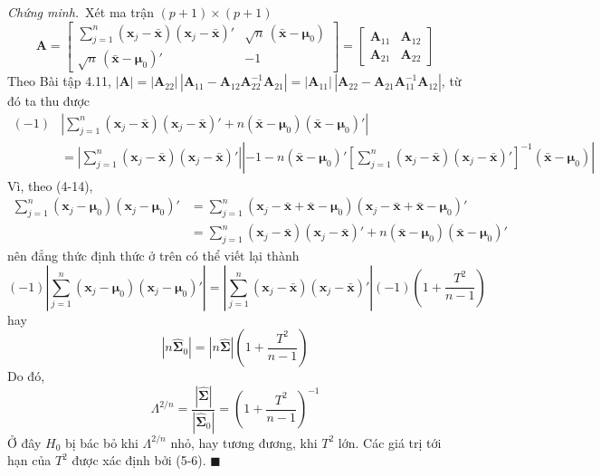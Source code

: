 \par\noindent\textit{Chứng minh.}\ 
Xét ma trận $(p+1)\times(p+1)$
\[
\mathbf{A} =
\begin{bmatrix}
\sum\limits_{j=1}^{n}(\mathbf{x}_j-\bar{\mathbf{x}})(\mathbf{x}_j-\bar{\mathbf{x}})' & \sqrt{n}\,(\bar{\mathbf{x}}-\boldsymbol{\mu}_0)\\[6pt]
\sqrt{n}\,(\bar{\mathbf{x}}-\boldsymbol{\mu}_0)' & -1
\end{bmatrix}
=
\begin{bmatrix}
\mathbf{A}_{11} & \mathbf{A}_{12}\\
\mathbf{A}_{21} & \mathbf{A}_{22}
\end{bmatrix}
\]
Theo Bài tập 4.11, $|\mathbf{A}| = |\mathbf{A}_{22}|\,|\mathbf{A}_{11}-\mathbf{A}_{12}\mathbf{A}_{22}^{-1}\mathbf{A}_{21}| = |\mathbf{A}_{11}|\,|\mathbf{A}_{22}-\mathbf{A}_{21}\mathbf{A}_{11}^{-1}\mathbf{A}_{12}|$, từ đó ta thu được
\begin{align*}
(-1)&\left|\sum_{j=1}^{n}(\mathbf{x}_j-\bar{\mathbf{x}})(\mathbf{x}_j-\bar{\mathbf{x}})' + n(\bar{\mathbf{x}}-\boldsymbol{\mu}_0)(\bar{\mathbf{x}}-\boldsymbol{\mu}_0)'\right| \\
&= \left|\sum_{j=1}^{n}(\mathbf{x}_j-\bar{\mathbf{x}})(\mathbf{x}_j-\bar{\mathbf{x}})'\right| \left|-1-n(\bar{\mathbf{x}}-\boldsymbol{\mu}_0)'\left[\sum_{j=1}^{n}(\mathbf{x}_j-\bar{\mathbf{x}})(\mathbf{x}_j-\bar{\mathbf{x}})'\right]^{-1}(\bar{\mathbf{x}}-\boldsymbol{\mu}_0)\right|
\end{align*}
Vì, theo (4-14),
\begin{align*}
\sum_{j=1}^{n}(\mathbf{x}_j-\boldsymbol{\mu}_0)(\mathbf{x}_j-\boldsymbol{\mu}_0)'
&= \sum_{j=1}^{n}(\mathbf{x}_j-\bar{\mathbf{x}}+\bar{\mathbf{x}}-\boldsymbol{\mu}_0)(\mathbf{x}_j-\bar{\mathbf{x}}+\bar{\mathbf{x}}-\boldsymbol{\mu}_0)' \\
&= \sum_{j=1}^{n}(\mathbf{x}_j-\bar{\mathbf{x}})(\mathbf{x}_j-\bar{\mathbf{x}})' + n(\bar{\mathbf{x}}-\boldsymbol{\mu}_0)(\bar{\mathbf{x}}-\boldsymbol{\mu}_0)'
\end{align*}
nên đẳng thức định thức ở trên có thể viết lại thành
\[
(-1)\left|\sum_{j=1}^{n}(\mathbf{x}_j-\boldsymbol{\mu}_0)(\mathbf{x}_j-\boldsymbol{\mu}_0)'\right|
= \left|\sum_{j=1}^{n}(\mathbf{x}_j-\bar{\mathbf{x}})(\mathbf{x}_j-\bar{\mathbf{x}})'\right|(-1)\left(1+\frac{T^2}{n-1}\right)
\]
hay
\[
|n\hat{\boldsymbol{\Sigma}}_0| = |n\hat{\boldsymbol{\Sigma}}|\left(1+\frac{T^2}{n-1}\right)
\]
Do đó,
\begin{equation}
\Lambda^{2/n} = \frac{|\hat{\boldsymbol{\Sigma}}|}{|\hat{\boldsymbol{\Sigma}}_0|} = \left(1+\frac{T^2}{n-1}\right)^{-1}
\tag{5-14}
\end{equation}
Ở đây $H_0$ bị bác bỏ khi $\Lambda^{2/n}$ nhỏ, hay tương đương, khi $T^2$ lớn. Các giá trị tới hạn của $T^2$ được xác định bởi (5-6). \hfill$\blacksquare$\par\medskip

